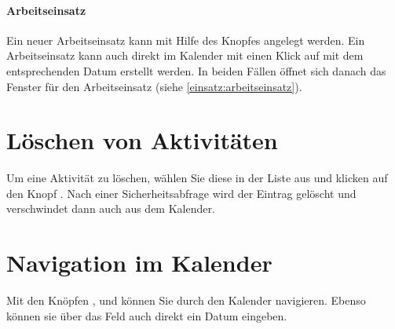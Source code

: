 \paragraph{Arbeitseinsatz}
Ein neuer Arbeitseinsatz kann mit Hilfe des Knopfes  angelegt werden.
Ein Arbeitseinsatz kann auch direkt im Kalender mit einen Klick auf \button{+} mit dem entsprechenden Datum erstellt werden.
In beiden Fällen öffnet sich danach das Fenster für den Arbeitseinsatz
(siehe \cref{einsatz:arbeitseinsatz}).




\section{Löschen von Aktivitäten}\label{einsatz:kalender:löschen}
Um eine Aktivität zu löschen, wählen Sie diese in der Liste aus
und klicken auf den Knopf .
Nach einer Sicherheitsabfrage wird der Eintrag gelöscht und verschwindet dann auch aus dem Kalender.



\section{Navigation im Kalender}\label{einsatz:kalender:navigieren}
Mit den Knöpfen ,  und  können Sie durch den Kalender navigieren.
Ebenso können sie über das Feld auch direkt ein Datum eingeben.



